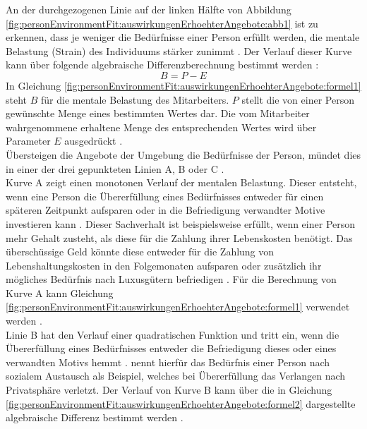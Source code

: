 An der durchgezogenen Linie auf der linken Hälfte von Abbildung \ref{fig:personEnvironmentFit:auswirkungenErhoehterAngebote:abb1} ist zu erkennen, dass je weniger die Bedürfnisse einer Person erfüllt werden, die mentale Belastung (Strain) des Individuums stärker zunimmt \cite{mechanismsOfJobStressAndStrain:1982}. Der Verlauf dieser Kurve kann über folgende algebraische Differenzberechnung bestimmt werden \cite[S. 2]{edwards:1993}:
\begin{equation}
	B = P - E
	\label{fig:personEnvironmentFit:auswirkungenErhoehterAngebote:formel1}
\end{equation}
In Gleichung \ref{fig:personEnvironmentFit:auswirkungenErhoehterAngebote:formel1} steht $B$ für die mentale Belastung des Mitarbeiters. $P$ stellt die von einer Person gewünschte Menge eines bestimmten Wertes dar. Die vom Mitarbeiter wahrgenommene erhaltene Menge des entsprechenden Wertes wird über Parameter $E$ ausgedrückt \cite[S. 2]{edwards:1993}.\\
Übersteigen die Angebote der Umgebung die Bedürfnisse der Person, mündet dies in einer der drei gepunkteten Linien A, B oder C \cite{mechanismsOfJobStressAndStrain:1982}.\\
Kurve A zeigt einen monotonen Verlauf der mentalen Belastung. Dieser entsteht, wenn eine Person die Übererfüllung eines Bedürfnisses entweder für einen späteren Zeitpunkt aufsparen oder in die Befriedigung verwandter Motive investieren kann \cite{mechanismsOfJobStressAndStrain:1982}. Dieser Sachverhalt ist beispielsweise erfüllt, wenn einer Person mehr Gehalt zusteht, als diese für die Zahlung ihrer Lebenskosten benötigt. Das überschüssige Geld könnte diese entweder für die Zahlung von Lebenshaltungskosten in den Folgemonaten aufsparen oder zusätzlich ihr mögliches Bedürfnis nach Luxusgütern befriedigen \cite[S. 21]{edwards:2008}. Für die Berechnung von Kurve A kann Gleichung \ref{fig:personEnvironmentFit:auswirkungenErhoehterAngebote:formel1} verwendet werden \cite[S. 2]{edwards:1993}.\\
Linie B hat den Verlauf einer quadratischen Funktion und tritt ein, wenn die Übererfüllung eines Bedürfnisses entweder die Befriedigung dieses oder eines verwandten Motivs hemmt \cite[S. 5]{caplan:1987}. \textcite{harrison:1978} nennt hierfür das Bedürfnis einer Person nach sozialem Austausch als Beispiel, welches bei Übererfüllung das Verlangen nach Privatsphäre verletzt. Der Verlauf von Kurve B kann über die in Gleichung \ref{fig:personEnvironmentFit:auswirkungenErhoehterAngebote:formel2} dargestellte algebraische Differenz bestimmt werden \cite[S. 2]{edwards:1993}.
